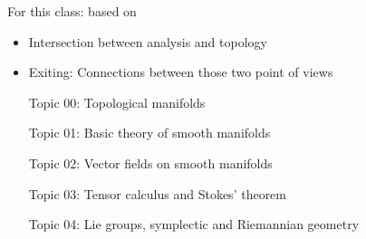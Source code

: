 \citation{}
For this class:  based on \cite{smooth_manifolds}
\begin{itemize}
    \item Intersection between analysis and topology
    \item Exiting: Connections between those two point of views 
\end{itemize}
\begin{enumerate}
    \item[Topic 00:] Topological manifolds 
    \item[Topic 01:] Basic theory of smooth manifolds
    \item[Topic 02:] Vector fields on smooth manifolds
    \item[Topic 03:] Tensor calculus and Stokes' theorem 
    \item[Topic 04:] Lie groups, symplectic and Riemannian geometry     
\end{enumerate}

